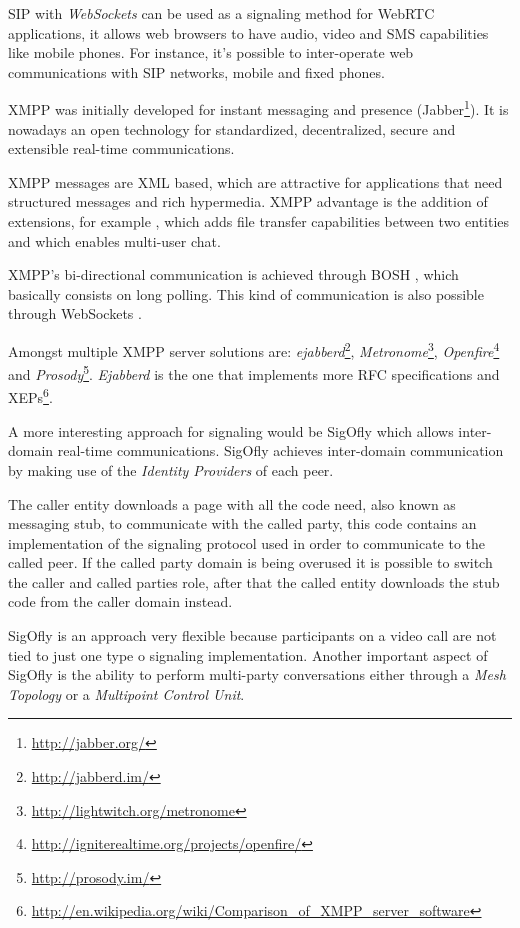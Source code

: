   \ac{SIP} with \textit{WebSockets} can be used as a signaling method for \ac{WebRTC} applications, it allows web browsers to have audio, video and \ac{SMS} capabilities like mobile phones. For instance, it's possible to inter-operate web communications with \ac{SIP} networks, mobile and fixed phones.

  \ac{XMPP} was initially developed for instant messaging and presence (Jabber\footnote{\url{http://jabber.org/}}). It is nowadays an open technology for standardized, decentralized, secure and extensible real-time communications. 

  \ac{XMPP} messages are \ac{XML} based, which are attractive for applications that need structured messages and rich hypermedia. \ac{XMPP} advantage is the addition of extensions, for example \cite{xep0096}, which adds file transfer capabilities between two entities and \cite{xep0045} which enables multi-user chat.

  \ac{XMPP}'s bi-directional communication is achieved through \ac{BOSH} \cite{xep0206}, which basically consists on long polling. This kind of communication is also possible through WebSockets \cite{rfc7395}.

  Amongst multiple XMPP server solutions are: \textit{ejabberd}\footnote{\url{http://jabberd.im/}}, \textit{Metronome}\footnote{\url{http://lightwitch.org/metronome}}, \textit{Openfire}\footnote{\url{http://igniterealtime.org/projects/openfire/}} and \textit{Prosody}\footnote{\url{http://prosody.im/}}. \textit{Ejabberd} is the one that implements more \ac{RFC} specifications and \ac{XEP}s\footnote{\url{http://en.wikipedia.org/wiki/Comparison_of_XMPP_server_software}}.

  A more interesting approach for signaling would be \ac{SigOfly}\cite{sigofly} which allows inter-domain real-time communications. \ac{SigOfly} achieves inter-domain communication by making use of the \textit{Identity Providers} of each peer. 

  The caller entity downloads a page with all the code need, also known as messaging stub, to communicate with the called party, this code contains an implementation of the signaling protocol used in order to communicate to the called peer. If the called party domain is being overused it is possible to switch the caller and called parties role, after that the called entity downloads the stub code from the caller domain instead.

  \ac{SigOfly} is an approach very flexible because participants on a video call are not tied to just one type o signaling implementation. Another important aspect of  \ac{SigOfly} is the ability to perform multi-party conversations either through a \textit{Mesh Topology} or a \textit{Multipoint Control Unit}.


